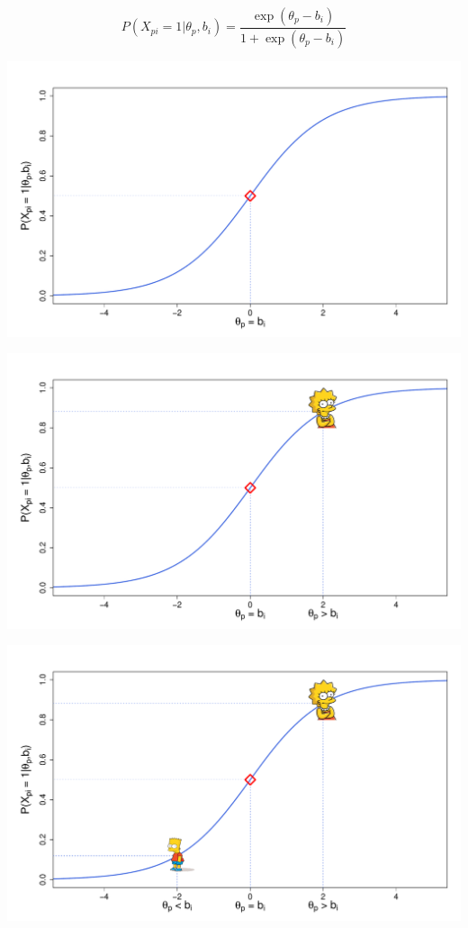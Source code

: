\documentclass[aspectratio=149, xcolor=table]{beamer}
\begin{document}
\begin{frame}

	\begin{equation*}
		P(X_{pi} = 1|\theta_p, b_i) = \dfrac{\exp(\theta_p - b_i)}{1 + \exp(\theta_p - b_i)}
	\end{equation*}
	
	
		\begin{overprint}
		\centering
			\centering
		\includegraphics[width=.8\linewidth]{img/base.pdf}
		
		\centering
			\centering
		\includegraphics[width=.8\linewidth]{img/lisa.pdf}
		
		\centering
			\centering
		\includegraphics[width=.8\linewidth]{img/bart.pdf}
	\end{overprint}
	

\end{frame}
\end{document}
